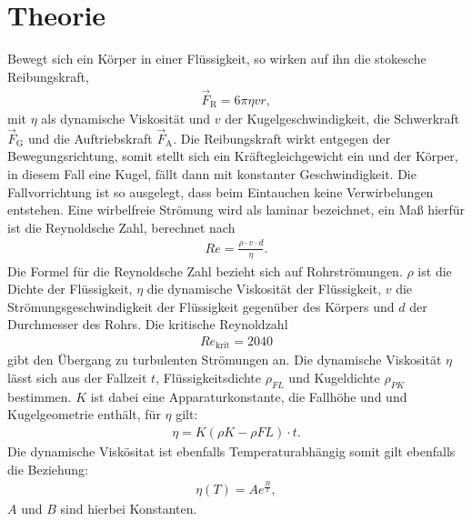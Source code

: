 \section{Theorie}
\label{sec:theorie}
Bewegt sich ein Körper in einer Flüssigkeit, so wirken auf
ihn die stokesche Reibungskraft,
\begin{align}
  \vec{F}_{\mathrm{R}}=6\pi\eta v r,
\end{align}
mit $\eta$ als dynamische Viskosität und $v$ der Kugelgeschwindigkeit,
die Schwerkraft $\vec{F}_{\mathrm{G}}$ und die Auftriebskraft $\vec{F}_{\mathrm{A}}$.
Die Reibungskraft wirkt entgegen der Bewegungsrichtung, somit stellt sich ein
Kräftegleichgewicht ein und der Körper, in diesem Fall eine Kugel,
fällt dann mit konstanter Geschwindigkeit.
Die Fallvorrichtung ist so ausgelegt, dass beim Eintauchen
keine Verwirbelungen entstehen. Eine wirbelfreie Strömung
wird als laminar bezeichnet, ein Maß hierfür ist die Reynoldsche Zahl, berechnet nach
\begin{align}
Re=\frac{\rho \cdot v \cdot d}{\eta}\label{eqn:rey}.
\end{align}
Die Formel für die Reynoldsche Zahl bezieht sich auf Rohrströmungen.
$\rho$ ist die Dichte der Flüssigkeit, $\eta$ die dynamische Viskosität der
Flüssigkeit, $v$ die Strömungsgeschwindigkeit der Flüssigkeit
gegenüber des Körpers und $d$ der Durchmesser des Rohrs\cite{rey}.
Die kritische Reynoldzahl
\begin{align*}
Re_{\mathrm{krit}}=2040
\end{align*}
gibt den Übergang zu turbulenten Strömungen an.\cite{reykrit}
Die dynamische Viskosität $\eta$ lässt sich
aus der Fallzeit $t$, Flüssigkeitsdichte $\rho_{FL}$ und Kugeldichte $\rho_{PK}$
bestimmen. $K$ ist dabei eine  Apparaturkonstante, die Fallhöhe
und und Kugelgeometrie enthält, für $\eta$ gilt:
\begin{align}
  \eta=K(\rho{K}-\rho{FL})\cdot t \label{eqn:vis}.
\end{align}
Die dynamische Viskösitat ist ebenfalls Temperaturabhängig somit gilt ebenfalls die Beziehung:
\begin{align}
  \eta(T)= A e^{\frac{B}{T}}\label{eqn:andra},
\end{align}
$A$ und $B$ sind hierbei Konstanten.
